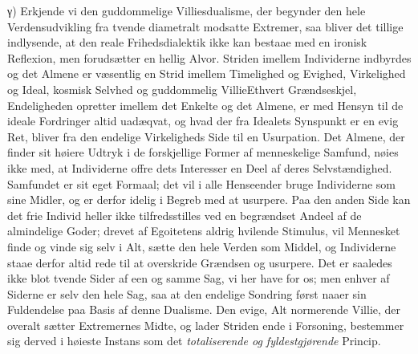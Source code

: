 \documentclass[12pt]{book}
\newcommand{\opage}[1]{\marginnote{\footnotesize\textit{[#1]}}}
\begin{document}
γ) Erkjende vi den guddommelige Villiesdualisme, der begynder den hele
Verdensudvikling fra tvende diametralt modsatte Extremer, saa bliver det tillige
indlysende, at den reale Frihedsdialektik ikke kan bestaae med en ironisk Reflexion,
men forudsætter en hellig Alvor. Striden imellem Individerne indbyrdes og det Almene
\opage{244} %
er væsentlig en Strid imellem Timelighed og Evighed, Virkelighed og Ideal, kosmisk
Selvhed og guddommelig Villie\quad Ethvert Grændseskjel, Endeligheden opretter imellem
det Enkelte og det Almene, er med Hensyn til de ideale Fordringer altid uadæqvat, og
hvad der fra Idealets Synspunkt er en evig Ret, bliver fra den endelige Virkeligheds
Side til en Usurpation. Det Almene, der finder sit høiere Udtryk i de forskjellige
Former af menneskelige Samfund, nøies ikke med, at Individerne offre dets Interesser
en Deel af deres Selvstændighed. Samfundet er sit eget Formaal; det vil i alle
Henseender bruge Individerne som sine Midler, og er derfor idelig i Begreb med at
usurpere. Paa den anden Side kan det frie Individ heller ikke tilfredsstilles ved en
begrændset Andeel af de almindelige Goder; drevet af Egoitetens aldrig hvilende
Stimulus, vil Mennesket finde og vinde sig selv i Alt, sætte den hele Verden som
Middel, og Individerne staae derfor altid rede til at overskride Grændsen og usurpere.
Det er saaledes ikke blot tvende Sider af een og samme Sag, vi her have for os; men
enhver af Siderne er selv den hele Sag, saa at den endelige Sondring først naaer sin
Fuldendelse paa Basis af denne Dualisme. Den evige, Alt normerende Villie, der overalt
sætter Extremernes Midte, og lader Striden ende i Forsoning, bestemmer sig derved i
høieste Instans som det \emph{totaliserende og fyldestgjørende} Princip.
\end{document}
